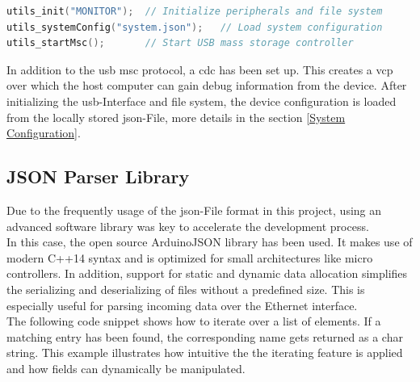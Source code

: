 \bigskip
{}
\begin{lstlisting}[backgroundcolor=\color{gray!10},  
                   basicstyle=\ttfamily,
                   columns=fullflexible,
                   breakatwhitespace=false,      
                   breaklines=true,                
                   captionpos=b,                    
                   commentstyle=\color{mygreen}, 
                   extendedchars=true,              
                   frame=single,                   
                   keepspaces=true,             
                   keywordstyle=\color{blue},      
                   language=c++,                 
                   numbers=none,                
                   numbersep=5pt,                   
                   numberstyle=\tiny\color{blue}, 
                   rulecolor=\color{mygray},        
                   showspaces=false,
                   showstringspaces=false,
                   showtabs=false,                 
                   stepnumber=5,                  
                   stringstyle=\color{mymauve},    
                   tabsize=2,                      
                   title=\lstname,
                   frame=none,
                   xleftmargin = 1cm,
                   framexleftmargin = 1em]
utils_init("MONITOR");  // Initialize peripherals and file system
utils_systemConfig("system.json");   // Load system configuration
utils_startMsc();       // Start USB mass storage controller
\end{lstlisting}

In addition to the \acrshort{usb} \acrshort{msc} protocol, a \acrfull{cdc} has been set up. This creates a \acrfull{vcp} over which the host computer can gain debug information from the device. \newline
After initializing the \acrshort{usb}-Interface and file system, the device configuration is loaded from the locally stored \acrshort{json}-File, more details in the section \ref{System Configuration}.

\subsection{JSON Parser Library} \label{JSON Parser Library}
Due to the frequently usage of the \acrshort{json}-File format in this project, using an advanced software library was key to accelerate the development process. \\
In this case, the open source ArduinoJSON library has been used. It makes use of modern C++14 syntax and is optimized for small architectures like micro controllers. In addition, support for static and dynamic data allocation simplifies the serializing and deserializing of files without a predefined size. This is especially useful for parsing incoming data over the Ethernet interface. \\[0.5em]
The following code snippet shows how to iterate over a list of elements. If a matching entry has been found, the corresponding name gets returned as a char string. This example illustrates how intuitive the the iterating feature is applied and how fields can dynamically be manipulated.

